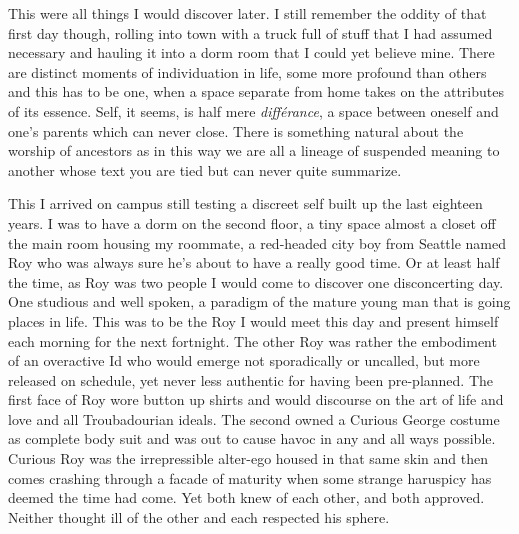 \documentclass[ebook, 10pt, openright, onecolumn]{memoir}
\begin{document}
This were all things I would discover later.  I still remember the oddity of
that first day though, rolling into town with a truck full of stuff that I had
assumed necessary and hauling it into a dorm room that I could yet believe mine.
There are distinct moments of individuation in life, some more profound than
others and this has to be one, when a space separate from home takes on the
attributes of its essence.  Self, it seems, is half mere \textit{différance}, a
space between oneself and one's parents which can never close.  There is something
natural about the worship of ancestors as in this way we are all a lineage of
suspended meaning to another whose text you are tied but can never quite
summarize.

This I arrived on campus still testing a discreet self built up the last
eighteen years.  I was to have a dorm on the second floor, a tiny space almost a
closet off the main room housing my roommate, a red-headed city boy from Seattle
named Roy who was always sure he's about to have a really good time.  Or at
least half the time, as Roy was two people I would come to discover one
disconcerting day.  One studious and well spoken, a paradigm of the mature young
man that is going places in life.  This was to be the Roy I would meet this day
and present himself each morning for the next fortnight.  The other Roy was
rather the embodiment of an overactive Id who would emerge not sporadically or
uncalled, but more released on schedule, yet never less authentic for having
been pre-planned.  The first face of Roy wore button up shirts and would
discourse on the art of life and love and all Troubadourian ideals.  The second
owned a Curious George costume as complete body suit and was out to cause havoc
in any and all ways possible.  Curious Roy was the irrepressible alter-ego
housed in that same skin and then comes crashing through a facade of maturity
when some strange haruspicy has deemed the time had come.  Yet both knew of each
other, and both approved.  Neither thought ill of the other and each respected
his sphere.  
\end{document}
